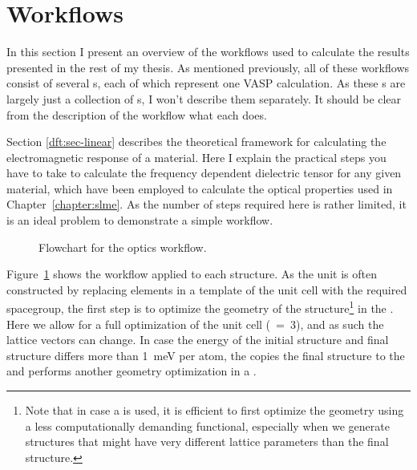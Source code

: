 \begin{refsection}
\begin{itemize}
\end{itemize} 
 
\section{Workflows} \label{automation:sec-workflows} 
 
In this section I present an overview of the workflows used to calculate the 
results presented in the rest of my thesis. As mentioned previously, all of 
these workflows consist of several s, each of which represent 
one \gls{VASP} calculation. As these s are largely just a 
collection of s, I won't describe them separately. It should be 
clear from the description of the workflow what each  does. 
 
 
Section \ref{dft:sec-linear} describes the theoretical framework for 
calculating the electromagnetic response of a material. Here I explain the 
practical steps you have to take to calculate the frequency dependent 
dielectric tensor for any given material, which have been employed to 
calculate the optical properties used in Chapter~\ref{chapter:slme}. As the 
number of steps required here is rather limited, it is an ideal problem to 
demonstrate a simple workflow. 
 
\begin{figure}[ht] 
 
\caption{\label{automation:fig-optics} Flowchart for the optics workflow.} 
\end{figure} 
 
Figure~\ref{automation:fig-optics} shows the workflow applied to each 
structure. As the unit is often constructed by replacing elements in a 
template of the unit cell with the required spacegroup, the first step is to 
optimize the geometry of the structure\footnote{Note that in case a 
 is used, it is efficient to first 
optimize the geometry using a less computationally demanding functional, 
especially when we generate structures that might have very different lattice 
parameters than the final structure.} in the . Here we allow 
for a full optimization of the unit cell (~=~3), and as such the 
lattice vectors can change. In case the energy of the initial structure and 
final structure differs more than 1~\si{\milli\electronvolt} per atom, the 
 copies the final structure 
 to the  and performs another geometry optimization 
in a . 
 

\end{refsection}
